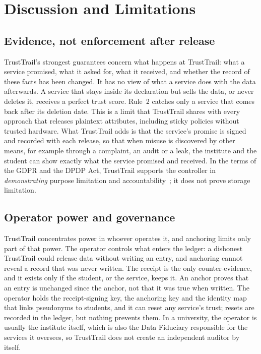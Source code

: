\section{Discussion and Limitations}
\label{sec:discussion}

\subsection{Evidence, not enforcement after release}
TrustTrail's strongest guarantees concern what happens at TrustTrail: what a service promised, what it asked for, what it received, and whether the record of these facts has been changed. It has no view of what a service does with the data afterwards. A service that stays inside its declaration but sells the data, or never deletes it, receives a perfect trust score. Rule~2 catches only a service that comes back after its deletion date. This is a limit that TrustTrail shares with every approach that releases plaintext attributes, including sticky policies without trusted hardware. What TrustTrail adds is that the service's promise is signed and recorded with each release, so that when misuse is discovered by other means, for example through a complaint, an audit or a leak, the institute and the student can show exactly what the service promised and received. In the terms of the GDPR and the DPDP Act, TrustTrail supports the controller in \emph{demonstrating} purpose limitation and accountability~\cite{gdpr2016,dpdp2023}; it does not prove storage limitation.

\subsection{Operator power and governance}
\label{sec:discussion-governance}
TrustTrail concentrates power in whoever operates it, and anchoring limits only part of that power. The operator controls what enters the ledger: a dishonest TrustTrail could release data without writing an entry, and anchoring cannot reveal a record that was never written. The receipt is the only counter-evidence, and it exists only if the student, or the service, keeps it. An anchor proves that an entry is unchanged since the anchor, not that it was true when written. The operator holds the receipt-signing key, the anchoring key and the identity map that links pseudonyms to students, and it can reset any service's trust; resets are recorded in the ledger, but nothing prevents them. In a university, the operator is usually the institute itself, which is also the Data Fiduciary responsible for the services it oversees, so TrustTrail does not create an independent auditor by itself.

